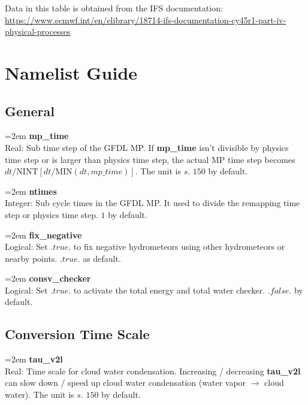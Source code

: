 \documentclass[letterpaper,titlepage,10pt]{article}
\numberwithin{equation}{section}
\begin{document}
\begin{appendices}
Data in this table is obtained from the IFS documentation: \url{https://www.ecmwf.int/en/elibrary/18714-ifs-documentation-cy45r1-part-iv-physical-processes}


\newpage
\section{Namelist Guide}
\setlength{\parskip}{0em}


\subsection{General}

\hangindent=2em
\textbf{mp\_time}\\ Real: Sub time step of the GFDL MP. If \textbf{mp\_time} isn't divisible by physics time step or is larger than physics time step, the actual MP time step becomes $dt / \text{NINT}[dt / \text{MIN}(dt, mp\_time)]$. The unit is $s$. $150$ by default.

\hangindent=2em
\textbf{ntimes}\\ Integer: Sub cycle times in the GFDL MP. It used to divide the remapping time step or physics time step. $1$ by default.

\hangindent=2em
\textbf{fix\_negative}\\ Logical: Set $.true.$ to fix negative hydrometeors using other hydrometeors or nearby points. $.true.$ as default.

\hangindent=2em
\textbf{consv\_checker}\\ Logical: Set $.true.$ to activate the total energy and total water checker. $.false.$ by default.


\subsection{Conversion Time Scale}

\hangindent=2em
\textbf{tau\_v2l}\\ Real: Time scale for cloud water condensation. Increasing / decreasing \textbf{tau\_v2l} can slow down / speed up cloud water condensation (water vapor $\rightarrow$ cloud water). The unit is $s$. $150$ by default.


\end{appendices}
\end{document}
